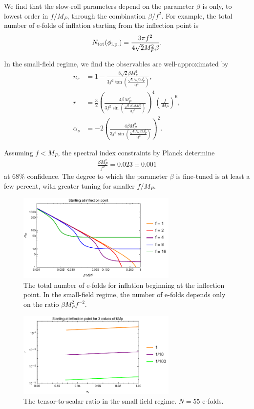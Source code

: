 \documentclass[aps,amsfonts,amsmath,prd,preprint,nofootinbib,superscriptaddress]{revtex4}
\newcommand{\Mp}{{M_{P}}}
\newcommand{\MMp}{{M_P^2}}
\begin{document}
We find that the slow-roll parameters depend
on the parameter $\beta$ is only, to lowest order in $f/\Mp$, through the combination $\beta/f^2$.  For example, the total number of e-folds of inflation starting from the inflection point is
\begin{align}
N_{\rm tot}(\phi_{\rm i.p.}) = \frac{3 \pi f^2}{4\sqrt{2}\MMp\beta}.
\end{align}

In the small-field regime, we find the observables are well-approximated by
\begin{align}
n_s &= 1- \frac{8\sqrt{2}\beta \MMp}{3f^2\tan(\frac{\sqrt{8}N_\ast\beta\MMp}{3 f^2})},\label{eq:nsSF}\\
r &= \frac{3}{2}\left(\frac{4\beta\MMp}{3f^2\sin(\frac{\sqrt{8}N_\ast\beta\MMp}{3 f^2})}\right)^4 \left(\frac{f}{\Mp}\right)^6 ,\\
\alpha_s &= -2\left(\frac{4\beta \MMp}{3f^2\sin(\frac{\sqrt{8}N_\ast\beta\MMp}{3 f^2})} \right)^2.
\end{align}

Assuming $f < \Mp$, the spectral index constraints by Planck \cite{Akrami:2018odb} determine
\begin{align}
\frac{\beta \MMp}{f^2} = 0.023 \pm 0.001
\end{align}
 at 68\% confidence.  The degree to which the parameter $\beta$ is fine-tuned is at least a few percent, with greater tuning for smaller $f/\Mp$.


\begin{figure}[!h]
  \centering
    \includegraphics[width=0.7\textwidth]{figures/NvsBetaf-2.pdf}
    \caption{The total number of e-folds for inflation beginning at the inflection point.  In the small-field regime, the number of e-folds depends only on the ratio $\beta \MMp f^{-2}.$}
\end{figure}



\begin{figure}[!h]
  \centering
    \includegraphics[width=0.7\textwidth]{figures/rvsnsplot.pdf}
    \caption{The tensor-to-scalar ratio in the small field regime.  $N = 55$ e-folds.}
\end{figure}
\end{document}
